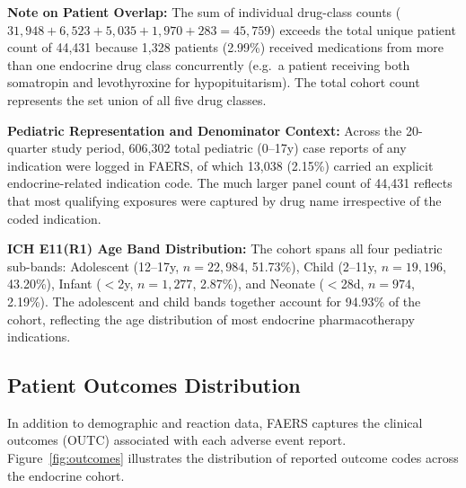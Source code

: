 \documentclass[10pt,twocolumn]{article}
\newcommand{\FAERS}{\textsf{FAERS}\xspace}
\begin{document}
\textbf{Note on Patient Overlap:} The sum of individual drug-class counts ($31{,}948 + 6{,}523 + 5{,}035 + 1{,}970 + 283 = 45{,}759$) exceeds the total unique patient count of 44{,}431 because 1{,}328 patients (2.99\%) received medications from more than one endocrine drug class concurrently (e.g.\ a patient receiving both somatropin and levothyroxine for hypopituitarism). The total cohort count represents the set union of all five drug classes.
 
\textbf{Pediatric Representation and Denominator Context:} Across the 20-quarter study period, 606{,}302 total pediatric (0--17y) case reports of any indication were logged in \FAERS, of which 13{,}038 (2.15\%) carried an explicit endocrine-related indication code. The much larger panel count of 44{,}431 reflects that most qualifying exposures were captured by drug name irrespective of the coded indication.
 
\textbf{ICH E11(R1) Age Band Distribution:} The cohort spans all four pediatric sub-bands: Adolescent (12--17y, $n = 22{,}984$, 51.73\%), Child (2--11y, $n = 19{,}196$, 43.20\%), Infant ($<$2y, $n = 1{,}277$, 2.87\%), and Neonate ($<$28d, $n = 974$, 2.19\%). The adolescent and child bands together account for 94.93\% of the cohort, reflecting the age distribution of most endocrine pharmacotherapy indications.
 
\subsection{Patient Outcomes Distribution}
 
In addition to demographic and reaction data, \FAERS captures the clinical outcomes (OUTC) associated with each adverse event report. Figure~\ref{fig:outcomes} illustrates the distribution of reported outcome codes across the endocrine cohort.
 
\end{document}
